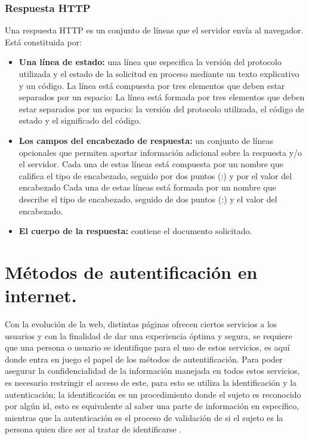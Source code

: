 \documentclass[12pt, a4paper, titlepage]{report}
\begin{document}
            \subsubsection{Respuesta HTTP}
                Una respuesta HTTP es un conjunto de líneas que el servidor envía al navegador. Está constituida por:
                \begin{itemize}
                    \item \textbf{Una línea de estado: } una línea que especifica la versión del protocolo utilizada y el estado de la solicitud en proceso mediante un texto explicativo y un código. La línea está compuesta por tres elementos que deben estar separados por un espacio: La línea está formada por tres elementos que deben estar separados por un espacio: la versión del protocolo utilizada, el código de estado y el significado del código.
                    \item \textbf{Los campos del encabezado de respuesta: } un conjunto de líneas opcionales que permiten aportar información adicional sobre la respuesta y/o el servidor. Cada una de estas líneas está compuesta por un nombre que califica el tipo de encabezado, seguido por dos puntos (:) y por el valor del encabezado Cada una de estas líneas está formada por un nombre que describe el tipo de encabezado, seguido de dos puntos (:) y el valor del encabezado.
                    \item \textbf{El cuerpo de la respuesta: } contiene el documento solicitado. 
                \end{itemize}


               
	    
	    
	    \section{Métodos de autentificación en internet.}
	    Con la evolución de la web, distintas páginas ofrecen ciertos servicios a los usuarios y con la finalidad de dar una experiencia óptima y segura, se requiere que una persona o usuario se identifique para el uso de estos servicios, es aquí donde entra en juego el papel de los métodos de autentificación. Para poder asegurar la confidencialidad de la información manejada en todos estos servicios, es necesario restringir el acceso de este, para esto se utiliza la identificación y la autenticación; la identificación es un procedimiento donde el sujeto es reconocido por algún \acrshort{id}, esto es equivalente al saber una parte de información en específico, mientras que la autenticación es el proceso de validación de si el sujeto es la persona quien dice ser al tratar de identificarse \cite{ComparisonAuthenticationMethodsResources}.\\
	    
\end{document}
